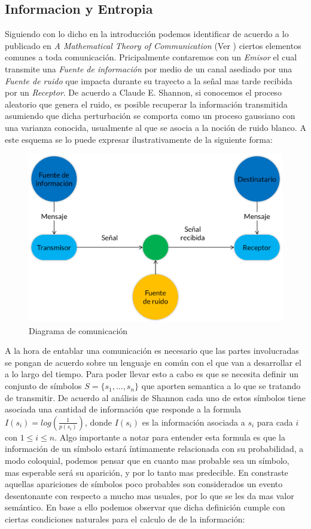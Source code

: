 
\subsection{Informacion y Entropia}

Siguiendo con lo dicho en la introducción podemos identificar de acuerdo a lo
publicado en \textit{A Mathematical Theory of Communication} (Ver \cite{shannon}) ciertos elementos
comunes a toda comunicación. Pricipalmente contaremos con un \textit{Emisor} el
cual transmite una \textit{Fuente de información} por medio de un canal
asediado por una \textit{Fuente de ruido} que impacta durante su trayecto a la
señal mas tarde recibida por un \textit{Receptor}. De acuerdo a Claude E.
Shannon, si conocemos el proceso aleatorio que genera el ruido, es posible
recuperar la información transmitida asumiendo que dicha perturbación se
comporta como un proceso gaussiano con una varianza conocida, usualmente al que
se asocia a la noción de ruido blanco. A este esquema se lo puede expresar
ilustrativamente de la siguiente forma:

\begin{figure}[ht]
\begin{center}
\includegraphics[width=0.6\columnwidth]{EsquemaShannon.png}
\caption{Diagrama de comunicación}
\end{center}
\end{figure}


A la hora de entablar una comunicación es necesario que las partes involucradas
se pongan de acuerdo sobre un lenguaje en común con el que van a desarrollar el
 a lo largo del tiempo. Para poder llevar esto a cabo es que se
necesita definir un conjunto de símbolos $S = \{ s_1, ..., s_n \}$ que aporten
semantica a lo que se tratando de transmitir. De acuerdo al análisis de Shannon
cada uno de estos símbolos tiene asociada una cantidad de información que
responde a la formula $I(s_i) = log(\frac{1}{p(s_i)})$, donde $I(s_i)$ es la
información asociada a $s_i$ para cada $i$ con $1 \leq i \leq n$. Algo
importante a notar para entender esta formula es que la información de un
símbolo estará íntimamente relacionada con su probabilidad, a modo
coloquial, podemos pensar que en cuanto mas probable sea un símbolo, mas
esperable será su aparición, y por lo tanto mas predecible. En constraste
aquellas apariciones de símbolos poco probables son considerados un evento
desentonante con respecto a mucho mas usuales, por lo que se les da mas valor
semántico. En base a ello podemos observar que dicha definición cumple con
ciertas condiciones naturales para el calculo de de la información:


